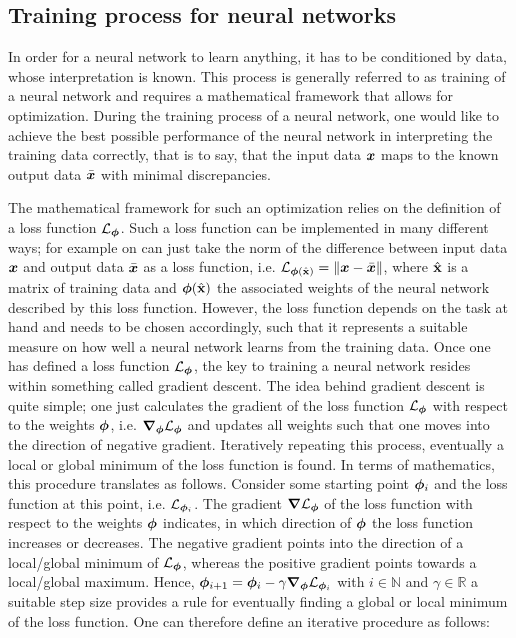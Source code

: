 \documentclass[a4paper,12pt]{report}
\begin{document}
\subsection{Training process for neural networks}
In order for a neural network to learn anything, it has to be conditioned by data, whose interpretation is known. This process is generally referred to as training of a neural network and requires a mathematical framework that allows for optimization. During the training process of a neural network, one would like to achieve the best possible performance of the neural network in interpreting the training data correctly, that is to say, that the input data $\bm{x}$ maps to the known output data $\bar{\bm{x}}$ with minimal discrepancies.

The mathematical framework for such an optimization relies on the definition of a loss function $\mathcal{L}_{\bm{\phi}}$. Such a loss function can be implemented in many different ways; for example on can just take the norm of the difference between input data $\bm{x}$ and output data $\bar{\bm{x}}$ as a loss function, i.e. $\mathcal{L}_{\bm{\phi}(\hat{\boldsymbol{\mathbf{x}}})} = \|\bm{x}-\bar{\bm{x}}\|$, where $\hat{\boldsymbol{\mathbf{x}}}$ is a matrix of training data and $\bm{\phi}(\hat{\boldsymbol{\mathbf{x}}})$ the associated weights of the neural network described by this loss function. However, the loss function depends on the task at hand and needs to be chosen accordingly, such that it represents a suitable measure on how well a neural network learns from the training data. Once one has defined a loss function $\mathcal{L}_{\bm{\phi}}$, the key to training a neural network resides within something called gradient descent. The idea behind gradient descent is quite simple; one just calculates the gradient of the loss function $\mathcal{L}_{\bm{\phi}}$ with respect to the weights $\bm{\phi}$, i.e. $\bm{\nabla}_{\bm{\phi}}\mathcal{L}_{\bm{\phi}}$ and updates all weights such that one moves into the direction of negative gradient. Iteratively repeating this process, eventually a local or global minimum of the loss function is found. In terms of mathematics, this procedure translates as follows. Consider some starting point $\bm{\phi}_i$ and the loss function at this point, i.e. $\mathcal{L}_{\bm{\phi}_i}$. The gradient $\bm{\nabla}\mathcal{L}_{\bm{\phi}}$ of the loss function with respect to the weights $\bm{\phi}$ indicates, in which direction of $\bm{\phi}$ the loss function increases or decreases. The negative gradient points into the direction of a local/global minimum of $\mathcal{L}_{\bm{\phi}}$, whereas the positive gradient points towards a local/global maximum. Hence, $\bm{\phi}_{i+1} = \bm{\phi}_{i} - \gamma \bm{\nabla}_{\bm{\phi}}\mathcal{L}_{\bm{\phi}_i}$ with $i \in \mathbb{N}$ and $\gamma \in \mathbb{R}$ a suitable step size provides a rule for eventually finding a global or local minimum of the loss function. One can therefore define an iterative procedure as follows:
\end{document}
